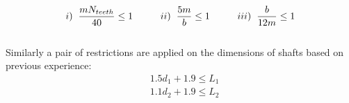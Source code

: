 \begin{equation}
i) \hspace{2mm}	\dfrac{mN_{teeth}}{40} \leq 1 \hspace{10mm} 
ii) \hspace{2mm} \dfrac{5m}{b} \leq 1 \hspace{10mm}
iii) \hspace{2mm} \dfrac{b}{12m} \leq 1
\end{equation}
\\
Similarly a pair of restrictions are applied on the dimensions 
of shafts based on previous experience:
\begin{equation}
\begin{split}
& 1.5d_{1} + 1.9 \leq L_{1}
\\ &
1.1d_{2} + 1.9 \leq L_{2}
\end{split}
\end{equation}  

\newpage


